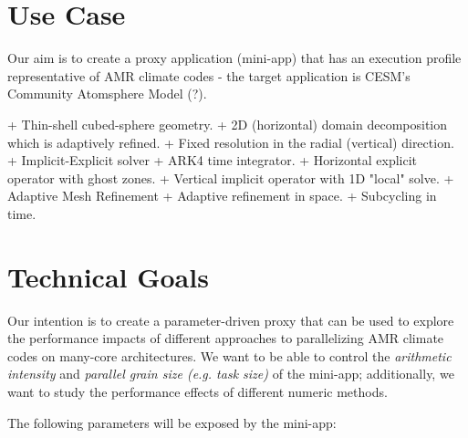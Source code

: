 \documentclass[final,letterpaper,10pt]{article}
\begin{document}
\section{Use Case}

Our aim is to create a proxy application (mini-app) that has an execution
profile representative of AMR climate codes - the target application is
CESM's Community Atomsphere Model (?).

+ Thin-shell cubed-sphere geometry.
  + 2D (horizontal) domain decomposition which is adaptively refined.
  + Fixed resolution in the radial (vertical) direction.
+ Implicit-Explicit solver 
  + ARK4 time integrator. 
  + Horizontal explicit operator with ghost zones.
  + Vertical implicit operator with 1D "local" solve.
+ Adaptive Mesh Refinement 
  + Adaptive refinement in space. 
  + Subcycling in time.

\section{Technical Goals}

Our intention is to create a parameter-driven proxy that can be used to explore
the performance impacts of different approaches to parallelizing AMR climate
codes on many-core architectures. We want to be able to control the
\emph{arithmetic intensity} and \emph{parallel grain size (e.g. task size)} of
the mini-app; additionally, we want to study the performance effects of
different numeric methods.

The following parameters will be exposed by the mini-app:
\end{document}

